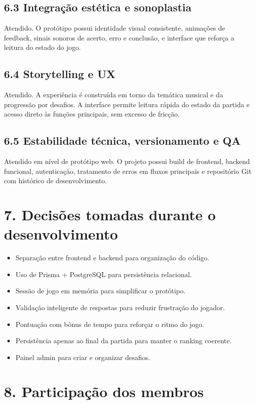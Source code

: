 \documentclass[12pt,a4paper]{article}
\begin{document}
\subsection*{6.3 Integração estética e sonoplastia}
Atendido. O protótipo possui identidade visual consistente, animações de feedback, sinais sonoros de acerto, erro e conclusão, e interface que reforça a leitura do estado do jogo.

\subsection*{6.4 Storytelling e UX}
Atendido. A experiência é construída em torno da temática musical e da progressão por desafios. A interface permite leitura rápida do estado da partida e acesso direto às funções principais, sem excesso de fricção.

\subsection*{6.5 Estabilidade técnica, versionamento e QA}
Atendido em nível de protótipo web. O projeto possui build de frontend, backend funcional, autenticação, tratamento de erros em fluxos principais e repositório Git com histórico de desenvolvimento.

\section*{7. Decisões tomadas durante o desenvolvimento}
\begin{itemize}[leftmargin=1.2em]
  \item Separação entre frontend e backend para organização do código.
  \item Uso de Prisma + PostgreSQL para persistência relacional.
  \item Sessão de jogo em memória para simplificar o protótipo.
  \item Validação inteligente de respostas para reduzir frustração do jogador.
  \item Pontuação com bônus de tempo para reforçar o ritmo do jogo.
  \item Persistência apenas ao final da partida para manter o ranking coerente.
  \item Painel admin para criar e organizar desafios.
\end{itemize}

\section*{8. Participação dos membros}
\end{document}
